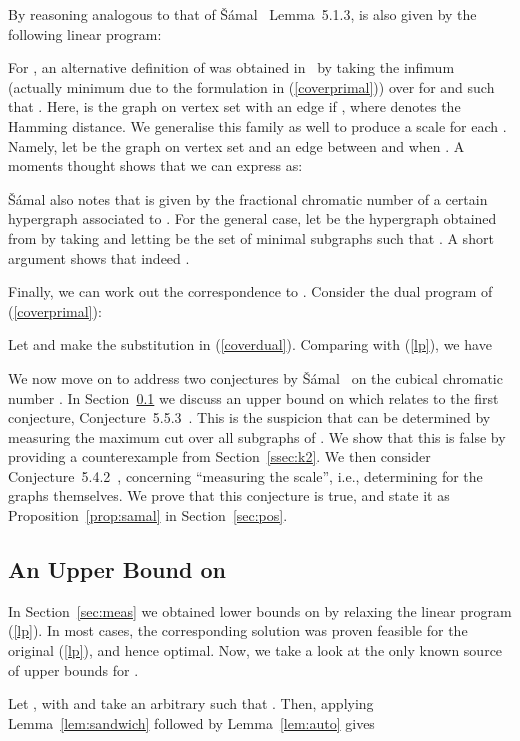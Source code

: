 \documentclass[11pt,a4paper]{article}
\begin{document}
By reasoning analogous to that of \v{S}\'{a}mal~\cite{samal:06} Lemma~5.1.3,  is also
given by the following linear program:


For , an alternative definition of  was
obtained in~\cite{samal:06} by taking the infimum 
(actually minimum due to the formulation in (\ref{coverprimal}))
over  for  and  such that .
Here,  is the graph on vertex set  with
an edge  if , where  denotes the
Hamming distance.
We generalise this family as well to produce a scale for each .
Namely, let  be the graph on vertex set  and an edge
between  and  when
.
A moments thought shows that we can express  as:

\v{S}\'{a}mal also notes that  is given by the fractional chromatic number
of a certain hypergraph associated to .
For the general case, let  be the hypergraph obtained from  by taking
 and letting  be the set of minimal subgraphs 
 such that .
A short argument shows that indeed .

Finally, we can work out the correspondence to .
Consider the dual program of (\ref{coverprimal}):

Let  and make the substitution  in 
(\ref{coverdual}).
Comparing with (\ref{lp}), we have




We now move on to address two conjectures by \v{S}\'{a}mal~\cite{samal:06} on the cubical
chromatic number .
In Section~\ref{sec:neg} we discuss an upper bound on  which relates to
the first conjecture, Conjecture~5.5.3~\cite{samal:06}.
This is the suspicion
that  can be determined by measuring the maximum cut over
all subgraphs of .
We show that this is false by providing a counterexample from
Section~\ref{ssec:k2}.
We then consider Conjecture~5.4.2~\cite{samal:06}, 
concerning ``measuring the scale'', i.e.,
determining  for the graphs  themselves.
We prove that this conjecture is true, 
and state it as Proposition~\ref{prop:samal} in Section~\ref{sec:pos}.


\subsection{An Upper Bound on } \label{sec:neg}

In Section~\ref{sec:meas} we obtained lower bounds on  by relaxing the
linear program (\ref{lp}).
In most cases, the corresponding solution was proven feasible for the
original (\ref{lp}), and hence optimal.
Now, we take a look at the only known source of upper bounds for .

Let , with  and take an arbitrary
 such that .
Then, applying Lemma~\ref{lem:sandwich} followed by Lemma~\ref{lem:auto}
gives
\end{document}
